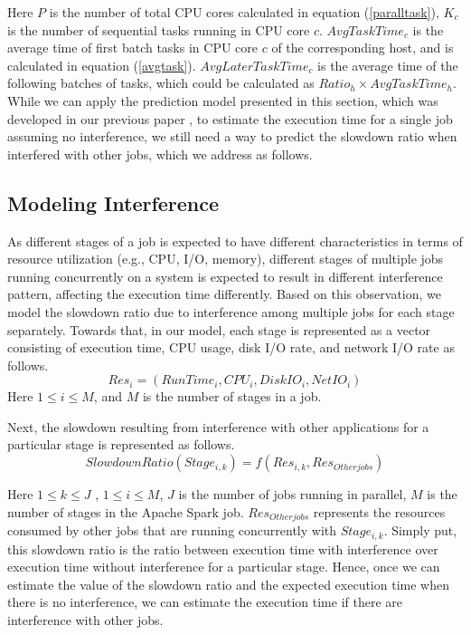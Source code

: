 Here $P$ is the number of total CPU cores calculated in equation (\ref{paralltask}), $K_c$ is the number of sequential tasks running in CPU core $c$. $AvgTaskTime_c$ is the average time of first batch tasks in CPU core $c$ of the corresponding host, and is calculated in equation (\ref{avgtask}). $AvgLaterTaskTime_c$ is the average time of the following batches of tasks, which could be calculated as $Ratio_h \times AvgTaskTime_h$.
\noindent
While we can apply the prediction model presented in this section, which was developed in our previous paper \cite{wangperformance}, to estimate the execution time for a single job assuming no interference, we still need a way to predict the slowdown ratio when interfered with other jobs, which we address as follows.
\subsection{Modeling Interference}
As different stages of a job is expected to have different characteristics in terms of resource utilization (e.g., CPU, I/O, memory), different stages of multiple jobs running concurrently on a system is expected to result in different interference pattern, affecting the execution time differently. Based on this observation, we model the slowdown ratio due to interference among multiple jobs for each stage separately. Towards that, in our model, each stage is represented as a vector consisting of execution time, CPU usage, disk I/O rate, and network I/O rate as follows.
\begin{equation}
\label{res}
Res_i = (RunTime_i, CPU_i, DiskIO_i, NetIO_i)
\end{equation}
Here $1 \leq i \leq M$, and $M$ is the number of stages in a job.
\par \noindent 
Next, the slowdown resulting from interference with other applications for a particular stage is represented as follows.
\begin{equation}
\label{slowdownratio}
SlowdownRatio(Stage_{i,k})
= f(Res_{i,k},Res_{Other jobs})
\end{equation}

\noindent
Here $1 \leq k \leq J$ , $1 \leq i \leq M$, $J$ is the number of jobs running in parallel, $M$ is the number of stages in the Apache Spark job. $Res_{Otherjobs}$ represents the resources consumed by other jobs that are running concurrently with $Stage_{i,k}$. 
Simply put, this slowdown ratio is the ratio between execution time with interference over execution time without interference for a particular stage. Hence, once we can estimate the value of the slowdown ratio and the expected execution time when there is no interference, we can estimate the execution time if there are interference with other jobs. 

